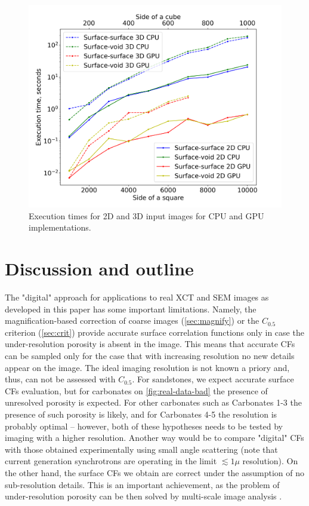 \documentclass[reprint,amsmath,amssymb,aps,pre,showkeys,showpacs]{revtex4-1}
\begin{document}
\begin{figure}[ht]
  \centering
  \includegraphics[width=\linewidth]{images/exec-time.png}
  \caption[]{Execution times for 2D and 3D input images for CPU and GPU
    implementations.}
  \label{fig:exec-times}
\end{figure}

\section{Discussion and outline}
\label{sec:outline}
The "digital" approach for applications to real XCT and SEM images as developed
in this paper has some important limitations. Namely, the magnification-based
correction of coarse images (\cref{sec:magnify}) or the $C_{0.5}$ criterion
(\cref{sec:crit}) provide accurate surface correlation functions only in case
the under-resolution porosity is absent in the image. This means that accurate
CFs can be sampled only for the case that with increasing resolution no new
details appear on the image. The ideal imaging resolution is not known a priory
and, thus, can not be assessed with $C_{0.5}$. For sandstones, we expect
accurate surface CFs evaluation, but for carbonates on \cref{fig:real-data-bad}
the presence of unresolved porosity is expected. For other carbonates such as
Carbonates 1-3 the presence of such porosity is likely, and for Carbonates 4-5
the resolution is probably optimal -- however, both of these hypotheses needs to
be tested by imaging with a higher resolution. Another way would be to compare
"digital" CFs with those obtained experimentally using small angle scattering
(note that current generation synchrotrons are operating in the limit
$\lesssim 1 \mu$ resolution). On the other hand, the surface CFs we obtain are
correct under the assumption of no sub-resolution details. This is an important
achievement, as the problem of under-resolution porosity can be then solved by
multi-scale image analysis \cite{moctezuma2002,SciRep1}.
\end{document}
